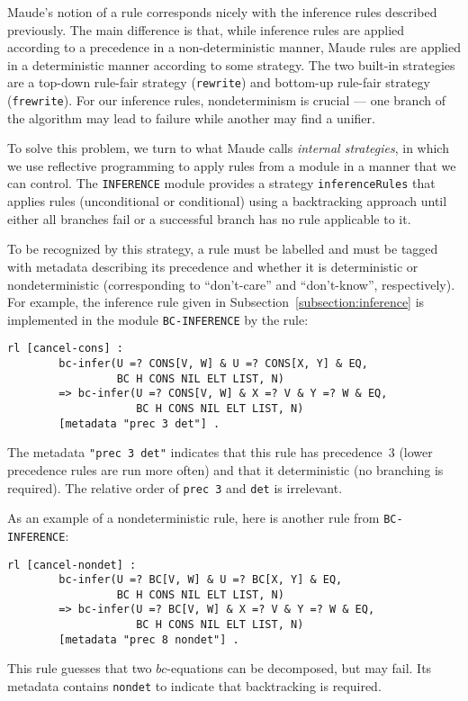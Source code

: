 \documentclass[11pt]{article}
\newcommand{\Bc}{\mathit{bc}}
\begin{document}
Maude's notion of a rule corresponds nicely with the inference rules described
previously. The main difference is that, while inference rules are applied
according to a precedence in a non-deterministic manner, Maude rules are applied
in a deterministic manner according to some strategy. The two built-in strategies
are a top-down rule-fair strategy (\lstinline|rewrite|) and bottom-up rule-fair
strategy (\lstinline|frewrite|). For our inference rules, nondeterminism is
crucial --- one branch of the algorithm may lead to failure while another may
find a unifier.

To solve this problem, we turn to what Maude calls \emph{internal strategies},
in which we use reflective programming to apply rules from a module in a manner
that we can control. The \lstinline|INFERENCE| module provides a strategy
\lstinline|inferenceRules| that applies rules (unconditional or conditional)
using a backtracking approach until either all branches fail or a successful
branch has no rule applicable to it.

To be recognized by this strategy, a rule must be labelled and must be tagged
with metadata describing its precedence and whether it is deterministic or
nondeterministic (corresponding to ``don't-care'' and ``don't-know'',
respectively).  For example, the inference rule given in
Subsection~\ref{subsection:inference} is implemented in the module
\lstinline|BC-INFERENCE| by the rule:
\begin{lstlisting}[language=Maude, style=smalllisting]
    rl [cancel-cons] :
        bc-infer(U =? CONS[V, W] & U =? CONS[X, Y] & EQ,
                 BC H CONS NIL ELT LIST, N)
        => bc-infer(U =? CONS[V, W] & X =? V & Y =? W & EQ,
                    BC H CONS NIL ELT LIST, N)
        [metadata "prec 3 det"] .
\end{lstlisting}
The metadata \lstinline|"prec 3 det"| indicates that this rule has precedence~3
(lower precedence rules are run more often) and that it deterministic (no
branching is required). The relative order of \lstinline|prec 3| and
\lstinline|det| is irrelevant.

As an example of a nondeterministic rule, here is another rule from
\lstinline|BC-INFERENCE|:
\begin{lstlisting}[language=Maude, style=smalllisting]
    rl [cancel-nondet] :
        bc-infer(U =? BC[V, W] & U =? BC[X, Y] & EQ,
                 BC H CONS NIL ELT LIST, N)
        => bc-infer(U =? BC[V, W] & X =? V & Y =? W & EQ,
                    BC H CONS NIL ELT LIST, N)
        [metadata "prec 8 nondet"] .
\end{lstlisting}
This rule guesses that two $\Bc$-equations can be decomposed, but may fail. Its
metadata contains \lstinline|nondet| to indicate that backtracking is required.
\end{document}
